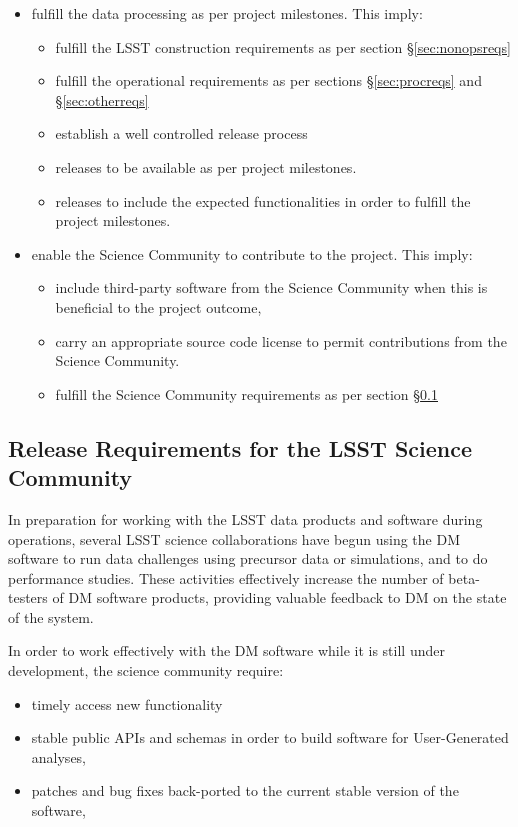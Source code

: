 \begin{itemize}
\item fulfill the data processing as per project milestones. This imply:
  \begin{itemize}
  \item fulfill the LSST construction requirements as per section \S\ref{sec:nonopsreqs}
  \item fulfill the operational requirements as per sections \S\ref{sec:procreqs} and \S\ref{sec:otherreqs}
  \item establish a well controlled release process
  \item releases to be available as per project milestones.
  \item releases to include the expected functionalities in order to fulfill the project milestones.
  \end{itemize}
\item enable the Science Community to contribute to the project. This imply:
  \begin{itemize}
  \item include third-party software from the Science Community when this is beneficial to the project outcome,
  \item carry an appropriate source code license to permit contributions from the Science Community.
  \item fulfill the Science Community requirements as per section \S\ref{sec:comreqs}
  \end{itemize}
\end{itemize}


\subsection{Release Requirements for the \gls{LSST} Science Community} \label{sec:comreqs}

In preparation for working with the \gls{LSST} data products and software during operations, several \gls{LSST} science collaborations have begun using the \gls{DM} software to run data challenges using precursor data or simulations, and to do performance studies. These activities effectively increase the number of beta-testers of \gls{DM} software products, providing valuable feedback to \gls{DM} on the state of the system.

In order to work effectively with the \gls{DM} software while it is still under development, the science community require:
\begin{itemize}
\item timely access new functionality
\item stable public APIs and schemas in order to build software for User-Generated analyses,
\item patches and bug fixes back-ported to the current stable version of the software,
\end{itemize}


